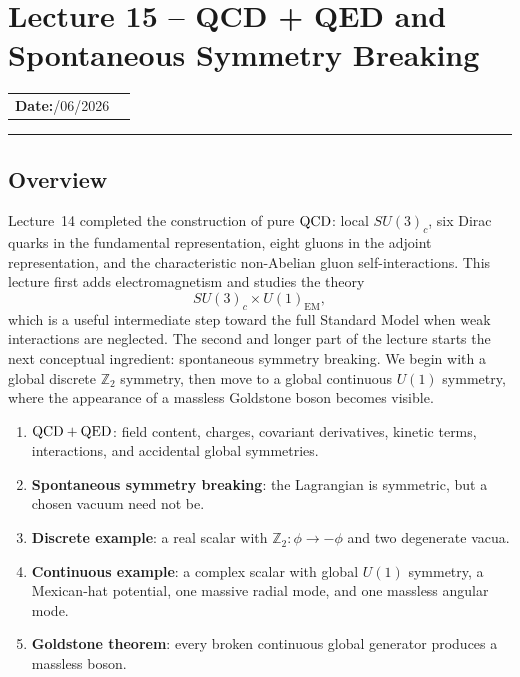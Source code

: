 
\section{Lecture 15 -- QCD + QED and Spontaneous Symmetry Breaking}\label{sec:lec15}
\begin{center}
\begin{tabular}{ll}
  \textbf{Date:}\quad 04/06/2026 & \\
\end{tabular}
\end{center}
\hrule\vspace{1.5em}

\subsection{Overview}\label{subsec:lec15:overview}

Lecture~14 completed the construction of pure $\mathrm{QCD}$: local $SU(3)_c$, six Dirac quarks in the fundamental representation, eight gluons in the adjoint representation, and the characteristic non-Abelian gluon self-interactions. This lecture first adds electromagnetism and studies the theory
\[
  SU(3)_c\times U(1)_{\mathrm{EM}},
\]
which is a useful intermediate step toward the full Standard Model when weak interactions are neglected. The second and longer part of the lecture starts the next conceptual ingredient: spontaneous symmetry breaking. We begin with a global discrete $\mathbb Z_2$ symmetry, then move to a global continuous $U(1)$ symmetry, where the appearance of a massless Goldstone boson becomes visible.

\begin{enumerate}
  \item \textbf{$\mathrm{QCD}+\mathrm{QED}$}: field content, charges, covariant derivatives, kinetic terms, interactions, and accidental global symmetries.
  \item \textbf{Spontaneous symmetry breaking}: the Lagrangian is symmetric, but a chosen vacuum need not be.
  \item \textbf{Discrete example}: a real scalar with $\mathbb Z_2:\phi\to-\phi$ and two degenerate vacua.
  \item \textbf{Continuous example}: a complex scalar with global $U(1)$ symmetry, a Mexican-hat potential, one massive radial mode, and one massless angular mode.
  \item \textbf{Goldstone theorem}: every broken continuous global generator produces a massless boson.
\end{enumerate}

